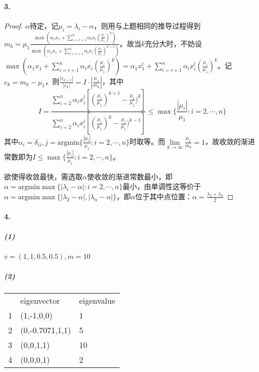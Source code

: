 \documentclass{ctexart}
\begin{document}
\paragraph{3.}
\begin{proof}
$\alpha$待定，记$\mu_i=\lambda_i-\alpha$，则用与上题相同的推导过程得到$m_k=\mu_1\frac{\max (\alpha_1x_1+\sum\limits_{i=r+1}^n \alpha_i x_i(\frac{\mu_i}{\mu_1})^k)}{\max (\alpha_1x_1+\sum\limits_{i=r+1}^n \alpha_i x_i(\frac{\mu_i}{\mu_1})^{k-1})}$。故当$k$充分大时，不妨设$\max (\alpha_1x_1 +\sum\limits_{i=r+1}^n \alpha_i x_i(\frac{\mu_i}{\mu_1})^k)=\alpha_1x_1^l+\sum\limits_{i=r+1}^n \alpha_i x^l_i(\frac{\mu_i}{\mu_1})^k$。记$e_k=m_k-\mu_1$，则$\frac{|e_{k+1}|}{|e_k|}=I\cdot |\frac{\mu_1}{m_k}|$，其中
\[I=\frac{\sum_{i=2}^n \alpha_i x_i^l[(\frac{\mu_i}{\mu_1})^{k+1}-\frac{\mu_i}{\mu_1})^{k}]}{\sum_{i=2}^n \alpha_i x_i^l[(\frac{\mu_i}{\mu_1})^{k}-\frac{\mu_i}{\mu_1})^{k-1}]}\leq \max\{\frac{|\mu_i|}{\mu_1}:i=2,\cdots,n\}\]
其中$\alpha_i=\delta_{ij},j=\mathrm{argmin}\{\frac{|\mu_i|}{\mu_1}:i=2,\cdots,n\}$时取等。而$\lim\limits_{k\to\infty}\frac{\mu_1}{m_k}=1$，故收敛的渐进常数即为$I\leq \max\{\frac{|\mu_i|}{\mu_1}:i=2,\cdots,n\}$。

欲使得收敛最快，需选取$\alpha$使收敛的渐进常数最小，即$\alpha=\mathrm{argmin}\max\{|\lambda_i-\alpha|:i=2,\cdots,n\}$最小，由单调性这等价于$\alpha=\mathrm{argmin}\max\{|\lambda_2-\alpha|,|\lambda_n-\alpha|\}$，即$\alpha$位于其中点位置：$\alpha=\frac{\lambda_2+\lambda_n}{2}$
\end{proof}

\paragraph{4.}
\subparagraph{(1)}
$v=(1,1,0.5,0.5),m=10$
\subparagraph{(2)}

\begin{tabular}{lll}
  & eigenvector     & eigenvalue \\
1 & (1,-1,0,0)      & 1          \\
2 & (0,-0.7071,1,1) & 5          \\
3 & (0,0,1,1)       & 10         \\
4 & (0,0,0,1)       & 2         
\end{tabular}
\end{document}
